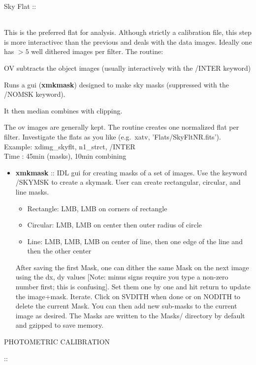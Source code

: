 \documentclass[11pt,letterpaper,dvips]{article}
\begin{document}
\begin{enumerate}
{\Large  \item Sky Flat :: } \\
	This is the preferred flat for analysis.  
	Although strictly a calibration file, this step is more interactivec
	than the previous and deals with the data images.  
	Ideally one has $>5$ well dithered images per filter.  The routine:

  \begin{Aenumerate}
    \item OV subtracts the object images (usually interactively with the /INTER 
	keyword) 
    \item Runs a gui ({\bf xmkmask}) designed to make sky masks (suppressed
	with the /NOMSK keyword). 
    \item It then median combines with clipping. 
  \end{Aenumerate}
    	The ov images are generally kept. The routine creates one normalized 
	flat per filter.  Investigate the flats as you like 
	(e.g.\ xatv, 'Flats/SkyFltNR.fits'). \\
        \quad Example: xdimg\_skyflt, n1\_strct, /INTER \\
	\quad Time   : 45min (masks), 10min combining

	\begin{itemize}
	   \item {\bf xmkmask} :: IDL gui for creating masks of a set of
	images.  Use the keyword /SKYMSK to create a skymask.  User
	can create rectangular, circular, and line masks.
		\begin{itemize}
		  \item Rectangle: LMB, LMB on corners of rectangle
		  \item Circular: LMB, LMB on center then outer radius of circle
		  \item Line: LMB, LMB, LMB on center of line, then one edge
			of the line and then the other center
		\end{itemize}
	After saving the first Mask, one can dither the same Mask on the next
	image using the dx, dy values [Note: minus signs require you type a 
	non-zero number first; this is confusing].  
	Set them one by one and hit return
	to update the image+mask.  Iterate.  Click on SVDITH when done or on
	NODITH to delete the current Mask.  You can then add new sub-masks 
	to the
	current image as desired.  The Masks are written to the Masks/
	directory by default and gzipped to save memory.
	\end{itemize}
	

{\Large  \item PHOTOMETRIC CALIBRATION} :: \\


\end{enumerate}
\end{document}
